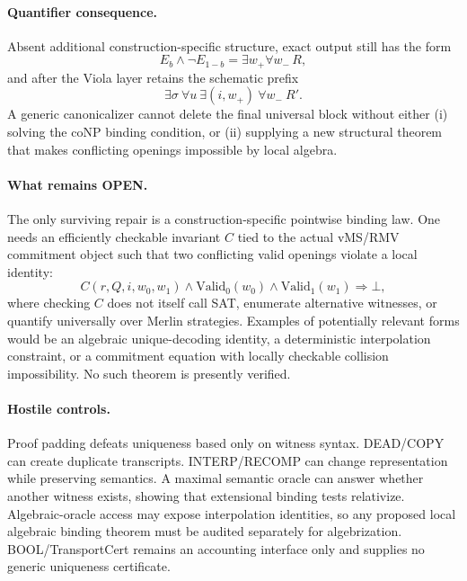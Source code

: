 \documentclass[11pt]{article}
\begin{document}
\paragraph{Quantifier consequence.}
Absent additional construction-specific structure, exact output still has the form
\[
E_b\wedge\neg E_{1-b}
=
\exists w_+\forall w_-\,R,
\]
and after the Viola layer retains the schematic prefix
\[
\exists\sigma\ \forall u\ \exists(i,w_+)\ \forall w_-\ R'.
\]
A generic canonicalizer cannot delete the final universal block without either (i) solving the coNP binding condition, or (ii) supplying a new structural theorem that makes conflicting openings impossible by local algebra.

\paragraph{What remains OPEN.}
The only surviving repair is a construction-specific pointwise binding law. One needs an efficiently checkable invariant $C$ tied to the actual vMS/RMV commitment object such that two conflicting valid openings violate a local identity:
\[
C(r,Q,i,w_0,w_1)\wedge
\mathrm{Valid}_0(w_0)\wedge
\mathrm{Valid}_1(w_1)
\Longrightarrow\bot,
\]
where checking $C$ does not itself call SAT, enumerate alternative witnesses, or quantify universally over Merlin strategies. Examples of potentially relevant forms would be an algebraic unique-decoding identity, a deterministic interpolation constraint, or a commitment equation with locally checkable collision impossibility. No such theorem is presently verified.

\paragraph{Hostile controls.}
Proof padding defeats uniqueness based only on witness syntax. DEAD/COPY can create duplicate transcripts. INTERP/RECOMP can change representation while preserving semantics. A maximal semantic oracle can answer whether another witness exists, showing that extensional binding tests relativize. Algebraic-oracle access may expose interpolation identities, so any proposed local algebraic binding theorem must be audited separately for algebrization. BOOL/TransportCert remains an accounting interface only and supplies no generic uniqueness certificate.
\end{document}
